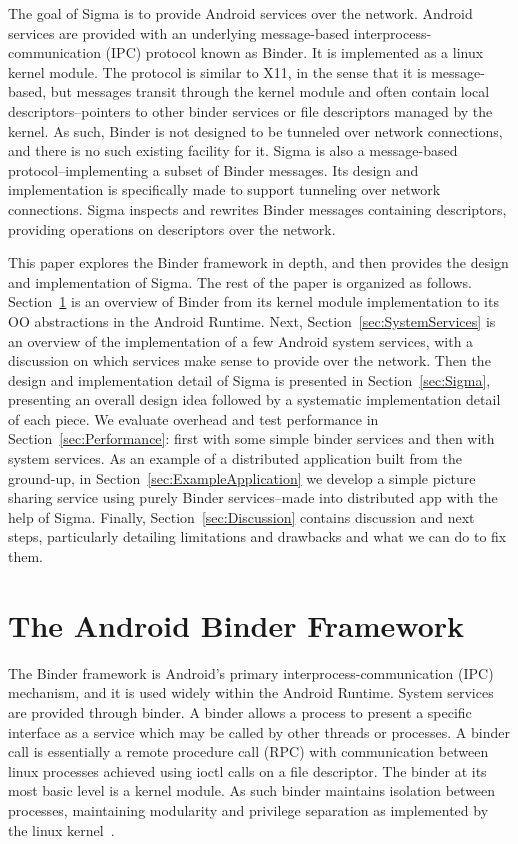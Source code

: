 \documentclass[prodmode]{acmlarge}
\begin{document}
The goal of Sigma is to provide Android services over the network. Android services are provided with an underlying message-based interprocess-communication (IPC) protocol known as Binder. It is implemented as a linux kernel module. The protocol is similar to X11, in the sense that it is message-based, but messages transit through the kernel module and often contain local descriptors--pointers to other binder services or file descriptors managed by the kernel. As such, Binder is not designed to be tunneled over network connections, and there is no such existing facility for it. Sigma is also a message-based protocol--implementing a subset of Binder messages. Its design and implementation is specifically made to support tunneling over network connections. Sigma inspects and rewrites Binder messages containing descriptors, providing operations on descriptors over the network.

This paper explores the Binder framework in depth, and then provides the design and implementation of Sigma. The rest of the paper is organized as follows. Section~\ref{sec:AndroidBinderFramework} is an overview of Binder from its kernel module implementation to its OO abstractions in the Android Runtime. Next, Section~\ref{sec:SystemServices} is an overview of the implementation of a few Android system services, with a discussion on which services make sense to provide over the network. Then the design and implementation detail of Sigma is presented in Section~\ref{sec:Sigma}, presenting an overall design idea followed by a systematic implementation detail of each piece. We evaluate overhead and test performance in Section~\ref{sec:Performance}: first with some simple binder services and then with system services. As an example of a distributed application built from the ground-up, in Section~\ref{sec:ExampleApplication} we develop a simple picture sharing service using purely Binder services--made into distributed app with the help of Sigma. Finally, Section~\ref{sec:Discussion} contains discussion and next steps, particularly detailing limitations and drawbacks and what we can do to fix them.

\section{The Android Binder Framework}
\label{sec:AndroidBinderFramework}
The Binder framework is Android's primary interprocess-communication (IPC) mechanism, and it is used widely within the Android Runtime. System services are provided through binder.
A binder allows a process to present a specific interface as a service which may be called by other threads or processes. A binder call is essentially a remote procedure call (RPC) with communication between linux processes achieved using ioctl calls on a file descriptor. The binder at its most basic level is a kernel module. As such binder maintains isolation between processes, maintaining modularity and privilege separation as implemented by the linux kernel~\cite{OpenBinder}.
\end{document}
